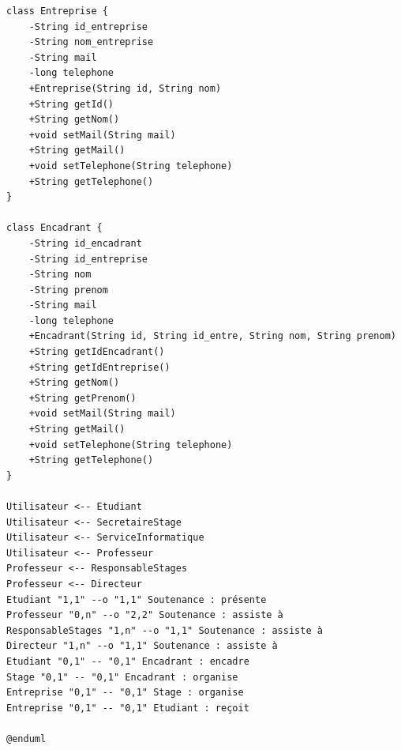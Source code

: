 \documentclass[11pt, a4paper]{report}
\begin{document}
\begin{verbatim}
class Entreprise {
	-String id_entreprise
	-String nom_entreprise
	-String mail
	-long telephone
	+Entreprise(String id, String nom)
	+String getId()
	+String getNom()
	+void setMail(String mail)
	+String getMail()
	+void setTelephone(String telephone)
	+String getTelephone()
}

class Encadrant {
	-String id_encadrant
	-String id_entreprise
	-String nom
	-String prenom
	-String mail
	-long telephone
	+Encadrant(String id, String id_entre, String nom, String prenom)
	+String getIdEncadrant()
	+String getIdEntreprise()
	+String getNom()
	+String getPrenom()
	+void setMail(String mail)
	+String getMail()
	+void setTelephone(String telephone)
	+String getTelephone()
}

Utilisateur <-- Etudiant
Utilisateur <-- SecretaireStage
Utilisateur <-- ServiceInformatique
Utilisateur <-- Professeur
Professeur <-- ResponsableStages
Professeur <-- Directeur
Etudiant "1,1" --o "1,1" Soutenance : présente
Professeur "0,n" --o "2,2" Soutenance : assiste à
ResponsableStages "1,n" --o "1,1" Soutenance : assiste à
Directeur "1,n" --o "1,1" Soutenance : assiste à
Etudiant "0,1" -- "0,1" Encadrant : encadre
Stage "0,1" -- "0,1" Encadrant : organise
Entreprise "0,1" -- "0,1" Stage : organise
Entreprise "0,1" -- "0,1" Etudiant : reçoit

@enduml
\end{verbatim}
\end{document}
